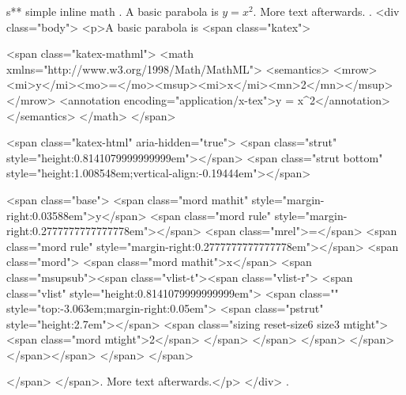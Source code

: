 s** simple inline math
.
A basic parabola is $y = x^2$. More text afterwards.
.
<div class="body">
<p>A basic parabola is <span class="katex">

<span class="katex-mathml">
<math xmlns="http://www.w3.org/1998/Math/MathML">
<semantics>
<mrow><mi>y</mi><mo>=</mo><msup><mi>x</mi><mn>2</mn></msup></mrow>
<annotation encoding="application/x-tex">y = x^2</annotation>
</semantics>
</math>
</span>

<span class="katex-html" aria-hidden="true">
<span class="strut" style="height:0.8141079999999999em"></span>
<span class="strut bottom" style="height:1.008548em;vertical-align:-0.19444em"></span>

<span class="base">
<span class="mord mathit" style="margin-right:0.03588em">y</span>
<span class="mord rule" style="margin-right:0.2777777777777778em"></span>
<span class="mrel">=</span>
<span class="mord rule" style="margin-right:0.2777777777777778em"></span>
<span class="mord">
<span class="mord mathit">x</span>
<span class="msupsub"><span class="vlist-t"><span class="vlist-r">
<span class="vlist" style="height:0.8141079999999999em">
<span class="" style="top:-3.063em;margin-right:0.05em">
<span class="pstrut" style="height:2.7em"></span>
<span class="sizing reset-size6 size3 mtight">
<span class="mord mtight">2</span>
</span>
</span>
</span>
</span></span></span>
</span>
</span>

</span>
</span>. More text afterwards.</p>
</div>
.
